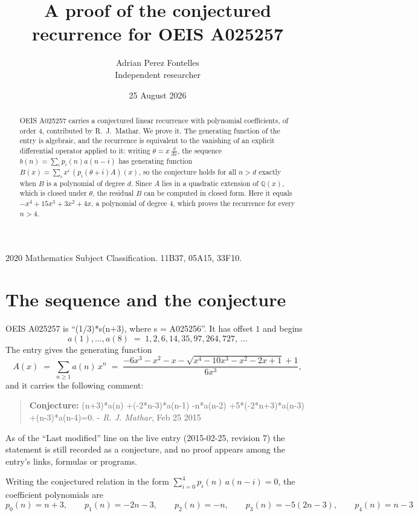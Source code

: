 \documentclass[11pt,a4paper]{article}
\title{A proof of the conjectured recurrence for OEIS A025257}
\author{Adrian Perez Fontelles\\ \small Independent researcher}
\date{25 August 2026}
\theoremstyle{plain}
\theoremstyle{definition}
\begin{document}
\maketitle

\begin{abstract}
OEIS A025257 carries a conjectured linear recurrence with polynomial coefficients, of
order 4, contributed by R.~J.~Mathar. We prove it. The generating function of the
entry is algebraic, and the recurrence is equivalent to the vanishing of an explicit
differential operator applied to it: writing $\theta=x\,\frac{d}{dx}$, the sequence
$b(n)=\sum_{i}p_{i}(n)a(n-i)$ has generating function
$B(x)=\sum_{i}x^{i}\,(p_{i}(\theta+i)A)(x)$, so the conjecture holds for all $n>d$ exactly
when $B$ is a polynomial of degree $d$. Since $A$ lies in a quadratic extension of
$\mathbb{Q}(x)$, which is closed under $\theta$, the residual $B$ can be computed in
closed form. Here it equals $- x^{4} + 15 x^{3} + 3 x^{2} + 4 x$, a polynomial of degree $4$, which proves
the recurrence for every $n>4$.
\end{abstract}

\noindent\small 2020 Mathematics Subject Classification. 11B37, 05A15, 33F10.\normalsize

\section{The sequence and the conjecture}

OEIS A025257 is ``(1/3)*s(n+3), where s = A025256''. It has offset $1$ and begins
\[
a(1),\dots,a(8)\;=\;1, 2, 6, 14, 35, 97, 264, 727,\ \dots
\]
The entry gives the generating function
\begin{equation}\label{eq:gf}
A(x)\;=\;\sum_{n\ge 1} a(n)\,x^{n}\;=\;\frac{- 6 x^{3} - x^{2} - x - \sqrt{x^{4} - 10 x^{3} - x^{2} - 2 x + 1} + 1}{6 x^{3}} ,
\end{equation}
and it carries the following comment:
\begin{quote}\small
\textbf{Conjecture:} (n+3)*a(n) +(-2*n-3)*a(n-1) -n*a(n-2) +5*(-2*n+3)*a(n-3) +(n-3)*a(n-4)=0. - \emph{R. J. Mathar}, Feb 25 2015
\end{quote}
As of the ``Last modified'' line on the live entry (2015-02-25, revision 7) the
statement is still recorded as a conjecture, and no proof appears among the entry's links,
formulas or programs.

Writing the conjectured relation in the form $\sum_{i=0}^{4}p_{i}(n)\,a(n-i)=0$,
the coefficient polynomials are
\[
p_{0}(n)=n + 3,\qquad p_{1}(n)=- 2 n - 3,\qquad p_{2}(n)=- n,\qquad p_{3}(n)=- 5 \left(2 n - 3\right),\qquad p_{4}(n)=n - 3
\]
\end{document}
